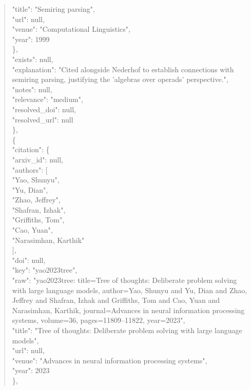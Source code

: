 \documentclass[11pt]{article}
\begin{document}
\begin{quote}
        "title": "Semiring parsing",\\
        "url": null,\\
        "venue": "Computational Linguistics",\\
        "year": 1999\\
      \},\\
      "exists": null,\\
      "explanation": "Cited alongside Nederhof to establish connections with semiring parsing, justifying the 'algebras over operads' perspective.",\\
      "notes": null,\\
      "relevance": "medium",\\
      "resolved\_doi": null,\\
      "resolved\_url": null\\
    \},\\
    \{\\
      "citation": \{\\
        "arxiv\_id": null,\\
        "authors": [\\
          "Yao, Shunyu",\\
          "Yu, Dian",\\
          "Zhao, Jeffrey",\\
          "Shafran, Izhak",\\
          "Griffiths, Tom",\\
          "Cao, Yuan",\\
          "Narasimhan, Karthik"\\
        ],\\
        "doi": null,\\
        "key": "yao2023tree",\\
        "raw": "yao2023tree: title=Tree of thoughts: Deliberate problem solving with large language models, author=Yao, Shunyu and Yu, Dian and Zhao, Jeffrey and Shafran, Izhak and Griffiths, Tom and Cao, Yuan and Narasimhan, Karthik, journal=Advances in neural information processing systems, volume=36, pages=11809--11822, year=2023",\\
        "title": "Tree of thoughts: Deliberate problem solving with large language models",\\
        "url": null,\\
        "venue": "Advances in neural information processing systems",\\
        "year": 2023\\
      \},\\

\end{quote}
\end{document}
